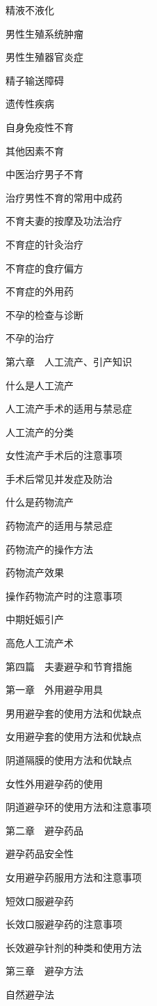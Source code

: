 \documentclass[12pt,UTF8]{ctexbook}
\begin{document}
精液不液化

男性生殖系统肿瘤

男性生殖器官炎症

精子输送障碍

遗传性疾病

自身免疫性不育

其他因素不育

中医治疗男子不育

治疗男性不育的常用中成药

不育夫妻的按摩及功法治疗

不育症的针灸治疗

不育症的食疗偏方

不育症的外用药

不孕的检查与诊断

不孕的治疗

第六章　人工流产、引产知识

什么是人工流产

人工流产手术的适用与禁忌症

人工流产的分类

女性流产手术后的注意事项

手术后常见并发症及防治

什么是药物流产

药物流产的适用与禁忌症

药物流产的操作方法

药物流产效果

操作药物流产时的注意事项

中期妊娠引产

高危人工流产术

第四篇　夫妻避孕和节育措施

第一章　外用避孕用具

男用避孕套的使用方法和优缺点

女用避孕套的使用方法和优缺点

阴道隔膜的使用方法和优缺点

女性外用避孕药的使用

阴道避孕环的使用方法和注意事项

第二章　避孕药品

避孕药品安全性

女用避孕药服用方法和注意事项

短效口服避孕药

长效口服避孕药的注意事项

长效避孕针剂的种类和使用方法

第三章　避孕方法

自然避孕法
\end{document}
